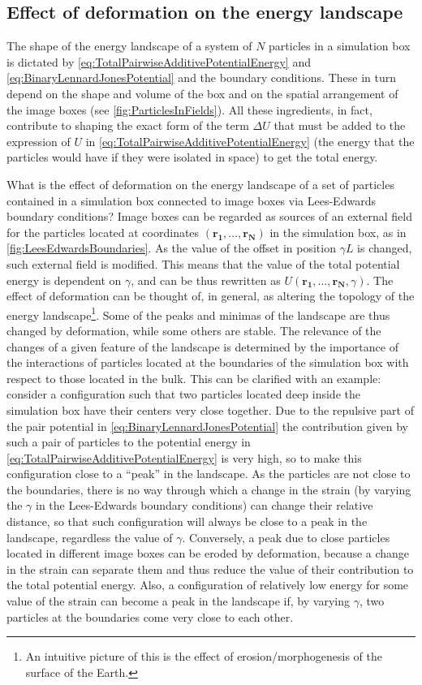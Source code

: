 \subsection{Effect of deformation on the energy landscape}

The shape of the energy landscape of a system of $N$ particles in a simulation box is dictated by \autoref{eq:TotalPairwiseAdditivePotentialEnergy} and \ref{eq:BinaryLennardJonesPotential} and the boundary conditions. These in turn depend on the shape and volume of the box and on the spatial arrangement of the image boxes (see \autoref{fig:ParticlesInFields}). All these ingredients, in fact, contribute to shaping the exact form of the term $\Delta U$ that must be added to the expression of $U$ in \autoref{eq:TotalPairwiseAdditivePotentialEnergy} (the energy that the particles would have if they were isolated in space) to get the total energy. 

What is the effect of deformation on the energy landscape of a set of particles contained in a simulation box connected to image boxes via Lees-Edwards boundary conditions? Image boxes can be regarded as sources of an external field for the particles located at coordinates $(\mathbf{r_{1}, \ldots, r_{N}})$ in the simulation box, as in \autoref{fig:LeesEdwardsBoundaries}. As the value of the offset in position $\gamma L$ is changed, such external field is modified. This means that the value of the total potential energy is dependent on $\gamma$, and can be thus rewritten as $U(\mathbf{r_{1}, \ldots, r_{N}}, \gamma)$.
The effect of deformation can be thought of, in general, as altering the topology of the energy landscape\footnote{An intuitive picture of this is the effect of erosion/morphogenesis of the surface of the Earth.}. Some of the peaks and minimas of the landscape are thus changed by deformation, while some others are stable. The relevance of the changes of a given feature of the landscape is determined by the importance of the interactions of particles located at the boundaries of the simulation box with respect to those located in the bulk. This can be clarified with an example: consider a configuration such that two particles located deep inside the simulation box have their centers very close together. Due to the repulsive part of the pair potential in \autoref{eq:BinaryLennardJonesPotential} the contribution given by such a pair of particles to the potential energy in \autoref{eq:TotalPairwiseAdditivePotentialEnergy} is very high, so to make this configuration close to a ``peak'' in the landscape. As the particles are not close to the boundaries, there is no way through which a change in the strain (by varying the $\gamma$ in the Lees-Edwards boundary conditions) can change their relative distance, so that such configuration will always be close to a peak in the landscape, regardless the value of $\gamma$. Conversely, a peak due to close particles located in different image boxes can be eroded by deformation, because a change in the strain can separate them and thus reduce the value of their contribution to the total potential energy. Also, a configuration of relatively low energy for some value of the strain can become a peak in the landscape if, by varying $\gamma$, two particles at the boundaries come very close to each other.

